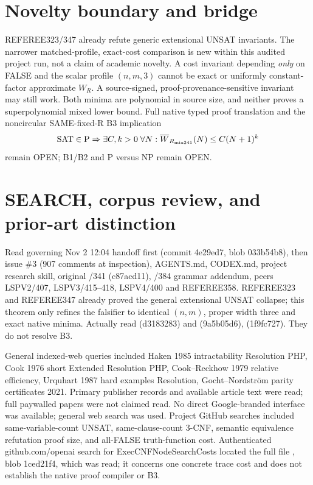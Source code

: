 \documentclass{article}
\begin{document}
\section*{Novelty boundary and bridge}
REFEREE323/347 already refute generic extensional UNSAT invariants. The narrower matched-profile, exact-cost comparison is new within this audited project run, not a claim of academic novelty. A cost invariant depending \emph{only} on FALSE and the scalar profile $(n,m,3)$ cannot be exact or uniformly constant-factor approximate $W_R$. A source-signed, proof-provenance-sensitive invariant may still work. Both minima are polynomial in source size, and neither proves a superpolynomial mixed lower bound. Full native typed proof translation and the noncircular SAME-fixed-R B3 implication
\[
{\rm SAT}\in{\rm P}\Rightarrow \exists C,k>0\;\forall N:\overline W_{R_{\mathrm{mix341}}}(N)\le C(N+1)^k
\]
remain OPEN; B1/B2 and P versus NP remain OPEN.

\section*{SEARCH, corpus review, and prior-art distinction}
Read governing Nov 2 12:04 handoff first (commit 4e29ed7, blob 033b54b8), then issue \#3 (907 comments at inspection), AGENTS.md, CODEX.md, project research skill, original /341 (c87acd11), /384 grammar addendum, peers LSPV2/407, LSPV3/415--418, LSPV4/400 and REFEREE358. REFEREE323 and REFEREE347 already proved the general extensional UNSAT collapse; this theorem only refines the falsifier to identical $(n,m)$, proper width three and exact native minima. Actually read  (d3183283) and  (9a5b05d6),  (1f9fc727). They do not resolve B3.

General indexed-web queries included Haken 1985 intractability Resolution PHP, Cook 1976 short Extended Resolution PHP, Cook--Reckhow 1979 relative efficiency, Urquhart 1987 hard examples Resolution, Gocht--Nordstr\"om parity certificates 2021. Primary publisher records and available article text were read; full paywalled papers were not claimed read. No direct Google-branded interface was available; general web search was used. Project GitHub searches included same-variable-count UNSAT, same-clause-count 3-CNF, semantic equivalence refutation proof size, and all-FALSE truth-function cost. Authenticated github.com/openai search for ExecCNFNodeSearchCosts located the full file , blob 1ced21f4, which was read; it concerns one concrete trace cost and does not establish the native proof compiler or B3.
\end{document}
